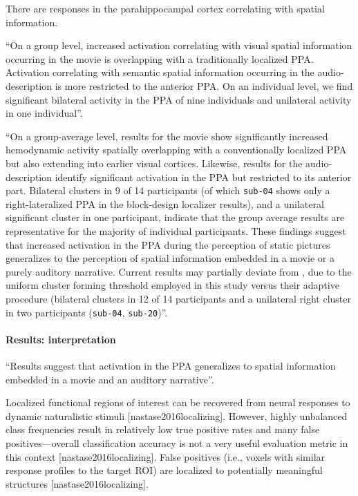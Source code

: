 %
There are responses in the parahippocampal cortex correlating with
spatial information.

``On a group level, increased activation correlating with visual spatial information
occurring in the movie is overlapping with a traditionally localized PPA.
Activation correlating with semantic spatial information occurring in the
audio-description is more restricted to the anterior PPA.
On an individual level, we find significant bilateral activity in the PPA
of nine individuals and unilateral activity in one individual''.

``On a group-average level, results for the movie show significantly
increased hemodynamic activity spatially overlapping with a conventionally
localized PPA but also extending into earlier visual cortices.
Likewise, results for the audio-description identify significant activation in
the PPA but restricted to its anterior part.
Bilateral clusters in 9 of 14
participants (of which \texttt{sub-04} shows only a right-lateralized PPA
in the block-design localizer results), and a unilateral
significant cluster in one participant, indicate that the group average results
are representative for the majority of individual participants.
These findings suggest that increased activation in the PPA during the
perception of static pictures generalizes to the perception of spatial
information embedded in a movie or a purely auditory narrative.
%
Current results may partially deviate from \citet{sengupta2016extension}, due to
the uniform cluster forming threshold employed in this study versus their
adaptive procedure (bilateral clusters in 12 of 14 participants and a unilateral
right cluster in two participants (\texttt{sub-04}, \texttt{sub-20})''.


\paragraph{Results: interpretation}

``Results suggest that activation in the PPA generalizes to spatial information
embedded in a movie and an auditory narrative''.



%
Localized functional regions of interest can be recovered from neural responses
to dynamic naturalistic stimuli [nastase2016localizing].
%
However, highly unbalanced class frequencies result in relatively low true
positive rates and many false positives—overall classification accuracy is not a
very useful evaluation metric in this context [nastase2016localizing].
%
False positives (i.e., voxels with similar response profiles to the target ROI)
are localized to potentially meaningful structures
[nastase2016localizing].

